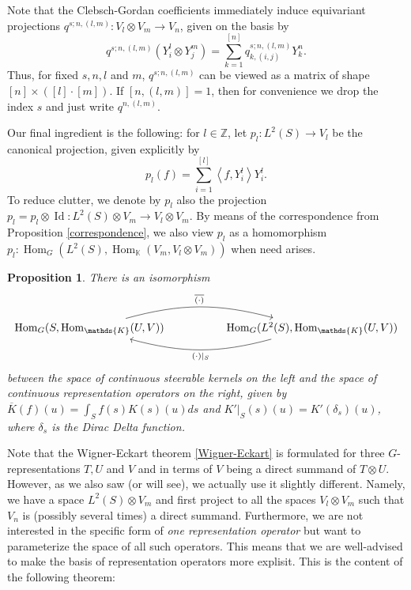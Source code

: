 \documentclass[12pt, a4paper]{article}
\theoremstyle{plain}
\newtheorem{pro}{Proposition}[section]
\theoremstyle{definition}
\theoremstyle{remark}
\newcommand{\Z}{\mathds{Z}}
\newcommand{\K}{\mathds{K}}
\DeclareMathOperator{\Hom}{Hom}
\DeclareMathOperator{\Id}{Id}
\begin{document}
Note that the Clebsch-Gordan coefficients immediately induce equivariant projections $q^{s;n,(l,m)}: V_l \otimes V_m \to V_n$, given on the basis by
\begin{equation*}
q^{s;n,(l,m)}(Y^l_i \otimes Y^m_j) = \sum_{k = 1}^{[n]} q_{k,(i,j)}^{s;n,(l,m)} Y_k^{n}.
\end{equation*}
Thus, for fixed $s,n,l$ and $m$, $q^{s;n,(l,m)}$ can be viewed as a matrix of shape $[n]\times ([l]\cdot [m])$. If $[n,(l,m)] = 1$, then for convenience we drop the index $s$ and just write $q^{n,(l,m)}$.

Our final ingredient is the following: for $l \in \Z$, let $p_l: L^2(S) \to V_l$ be the canonical projection, given explicitly by
\begin{equation*}
p_l(f) = \sum_{i = 1}^{[l]} \left\langle  f, Y^l_i \right\rangle Y^l_i.
\end{equation*}
To reduce clutter, we denote by $p_l$ also the projection $p_l = p_l \otimes \Id: L^2(S) \otimes V_m \to V_l \otimes V_m$. By means of the correspondence from Proposition \ref{correspondence}, we also view $p_l$ as a homomorphism $p_l: \Hom_G(L^2(S), \Hom_\K(V_m, V_l \otimes V_m))$ when need arises.

\begin{pro}\label{steerable kernels = representation operators}
There is an isomorphism
\begin{equation*}
\begin{tikzcd}
\Hom_G(S, \Hom_{\K}(U, V)) \ar[rr, bend left = 15, "\overline{(\cdot)}"] & & \Hom_G(L^2(S), \Hom_{\K}(U, V)) \ar[ll, bend left = 15, "(\cdot)|_{S}"]
\end{tikzcd}
\end{equation*}
between the space of continuous steerable kernels on the left and the space of continuous representation operators on the right, given by $\overline{K}(f)(u) = \int_{S}f(s)K(s)(u)ds$ and $K'|_{S}(s)(u) = K'(\delta_s)(u)$, where $\delta_s$ is the Dirac Delta function.
\end{pro}

Note that the Wigner-Eckart theorem \ref{Wigner-Eckart} is formulated for three $G$-representations $T, U$ and $V$ and in terms of $V$ being a direct summand of $T \otimes U$. However, as we also saw (or will see), we actually use it slightly different. Namely, we have a space $L^2(S) \otimes V_m$ and first project to all the spaces $V_l \otimes V_m$ such that $V_n$ is (possibly several times) a direct summand. Furthermore, we are not interested in the specific form of \emph{one representation operator} but want to parameterize the space of all such operators. This means that we are well-advised to make the basis of representation operators more explisit. This is the content of the following theorem:
\end{document}

